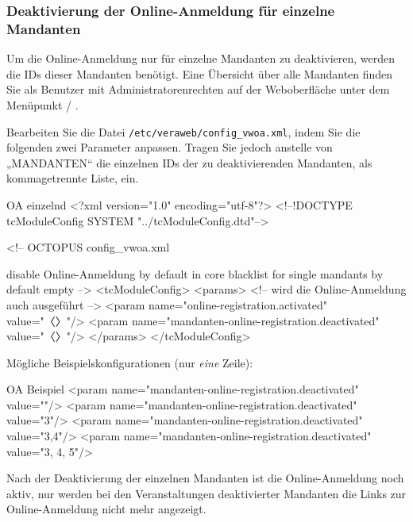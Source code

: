 \documentclass{tarentanleitung}
\begin{document}
\subsubsection{Deaktivierung der Online-Anmeldung für einzelne Mandanten}

Um die Online-Anmeldung nur für einzelne Mandanten zu deaktivieren,
werden die IDs dieser Mandanten benötigt. Eine Übersicht über alle
Mandanten finden Sie als Benutzer mit Administratorenrechten auf der
Weboberfläche unter dem Menüpunkt  /
.

\begin{minipage}{\linewidth}
Bearbeiten Sie die Datei \texttt{/etc/veraweb/config\_vwoa.xml},
indem Sie die folgenden zwei Parameter anpassen.
Tragen Sie jedoch anstelle von „MANDANTEN“ die einzelnen IDs der zu
deaktivierenden Mandanten, als kommagetrennte Liste, ein.

\begin{lstdump}[language=XML,tabsize=2]{OA einzelnd}
<?xml version="1.0" encoding="utf-8"?>
<!--!DOCTYPE tcModuleConfig SYSTEM "../tcModuleConfig.dtd"-->

<!--
	OCTOPUS config_vwoa.xml

	disable Online-Anmeldung by default in core
	blacklist for single mandants by default empty
-->
<tcModuleConfig>
	<params>
		<!-- wird die Online-Anmeldung auch ausgeführt -->
		<param name="online-registration.activated" value="〈\color{blue}〉"/>
		<param name="mandanten-online-registration.deactivated" value="〈\color{blue}〉"/>
	</params>
</tcModuleConfig>
\end{lstdump}

Mögliche Beispielskonfigurationen (nur \emph{eine} Zeile):

\begin{lstdump}[language=XML]{OA Beispiel}
        <param name="mandanten-online-registration.deactivated" value=""/>
        <param name="mandanten-online-registration.deactivated" value="3"/>
        <param name="mandanten-online-registration.deactivated" value="3,4"/>
        <param name="mandanten-online-registration.deactivated" value="3, 4, 5"/>
\end{lstdump}
\end{minipage}

Nach der Deaktivierung der einzelnen Mandanten ist die Online-Anmeldung noch
aktiv, nur werden bei den Veranstaltungen deaktivierter Mandanten die Links
zur Online-Anmeldung nicht mehr angezeigt.
\end{document}
